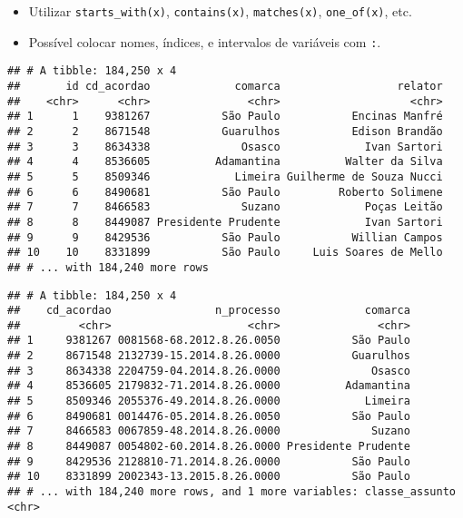 \documentclass[]{book}
\newenvironment{Shaded}{\begin{snugshade}}{\end{snugshade}}
\newcommand{\KeywordTok}[1]{\textcolor[rgb]{0.13,0.29,0.53}{\textbf{{#1}}}}
\newcommand{\DataTypeTok}[1]{\textcolor[rgb]{0.13,0.29,0.53}{{#1}}}
\newcommand{\StringTok}[1]{\textcolor[rgb]{0.31,0.60,0.02}{{#1}}}
\newcommand{\NormalTok}[1]{{#1}}
\providecommand{\tightlist}{%
  \setlength{\itemsep}{0pt}\setlength{\parskip}{0pt}}
\begin{document}
\begin{itemize}
\tightlist
\item
  Utilizar \texttt{starts\_with(x)}, \texttt{contains(x)},
  \texttt{matches(x)}, \texttt{one\_of(x)}, etc.
\item
  Possível colocar nomes, índices, e intervalos de variáveis com
  \texttt{:}.
\end{itemize}

\begin{Shaded}
\end{Shaded}

\begin{verbatim}
## # A tibble: 184,250 x 4
##       id cd_acordao             comarca                  relator
##    <chr>      <chr>               <chr>                    <chr>
## 1      1    9381267           São Paulo           Encinas Manfré
## 2      2    8671548           Guarulhos           Edison Brandão
## 3      3    8634338              Osasco             Ivan Sartori
## 4      4    8536605          Adamantina          Walter da Silva
## 5      5    8509346             Limeira Guilherme de Souza Nucci
## 6      6    8490681           São Paulo         Roberto Solimene
## 7      7    8466583              Suzano             Poças Leitão
## 8      8    8449087 Presidente Prudente             Ivan Sartori
## 9      9    8429536           São Paulo           Willian Campos
## 10    10    8331899           São Paulo     Luis Soares de Mello
## # ... with 184,240 more rows
\end{verbatim}

\begin{Shaded}
\end{Shaded}

\begin{verbatim}
## # A tibble: 184,250 x 4
##    cd_acordao                n_processo             comarca
##         <chr>                     <chr>               <chr>
## 1     9381267 0081568-68.2012.8.26.0050           São Paulo
## 2     8671548 2132739-15.2014.8.26.0000           Guarulhos
## 3     8634338 2204759-04.2014.8.26.0000              Osasco
## 4     8536605 2179832-71.2014.8.26.0000          Adamantina
## 5     8509346 2055376-49.2014.8.26.0000             Limeira
## 6     8490681 0014476-05.2014.8.26.0050           São Paulo
## 7     8466583 0067859-48.2014.8.26.0000              Suzano
## 8     8449087 0054802-60.2014.8.26.0000 Presidente Prudente
## 9     8429536 2128810-71.2014.8.26.0000           São Paulo
## 10    8331899 2002343-13.2015.8.26.0000           São Paulo
## # ... with 184,240 more rows, and 1 more variables: classe_assunto <chr>
\end{verbatim}
\end{document}
